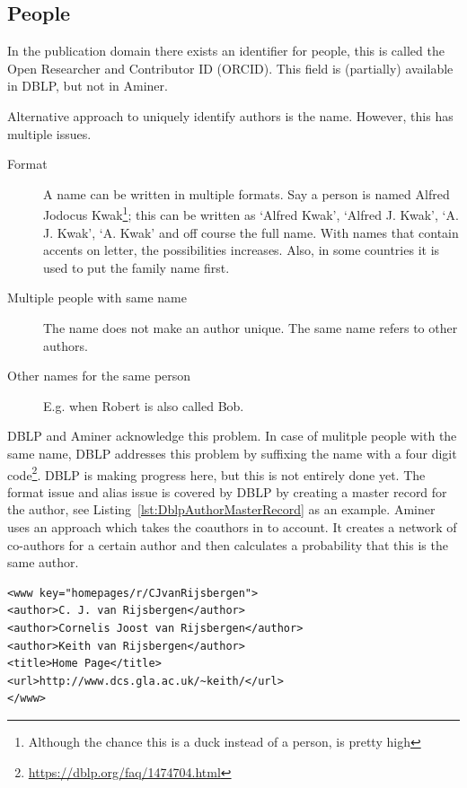 \documentclass{ou-report}
\begin{document}
\subsection{People}
\label{sec:integrability_people}
In the publication domain there exists an identifier for people, this is called
the Open Researcher and Contributor ID (ORCID). This field is (partially) 
available in DBLP, but not in Aminer.

Alternative approach to uniquely identify authors is the name. However, this has
multiple issues. 
\begin{description}
    \item[Format] A name can be written in multiple formats. Say a person is 
    named Alfred Jodocus Kwak\footnote{Although the chance this is a duck 
    instead of a person, is pretty high}; this can be written as `Alfred Kwak', 
    `Alfred J. Kwak', `A. J. Kwak', `A. Kwak' and off course the full name. 
    With names that contain accents on letter, the possibilities increases.
    Also, in some countries it is used to put the family name first.
    \item[Multiple people with same name] The name does not make an author unique. The same name
    refers to other authors. 
    \item[Other names for the same person] E.g. when Robert is also called Bob.
\end{description}

DBLP and Aminer acknowledge this problem. 
In case of mulitple 
people with the same name, DBLP addresses this problem by suffixing the
name with a four digit code\footnote{\url{https://dblp.org/faq/1474704.html}}.
DBLP is making progress here, but this is not entirely done yet. 
The format issue and alias issue is covered by DBLP by creating a master 
record for the author, see Listing~\ref{lst:DblpAuthorMasterRecord} as an 
example.
Aminer uses an approach which takes the coauthors in to account. It creates
a network of co-authors for a certain author and then calculates a 
probability that this is the same author.
\lstset{language=XML}
\begin{lstlisting}[caption={Example master record (\url{https://dblp.org/faq/1474690.html})},label={lst:DblpAuthorMasterRecord}]
<www key="homepages/r/CJvanRijsbergen">
<author>C. J. van Rijsbergen</author>
<author>Cornelis Joost van Rijsbergen</author>
<author>Keith van Rijsbergen</author>
<title>Home Page</title>
<url>http://www.dcs.gla.ac.uk/~keith/</url>
</www>
\end{lstlisting}
\end{document}
